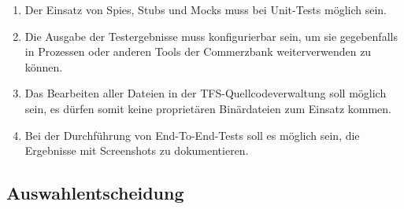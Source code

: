 \begin{enumerate}
	\item Der Einsatz von Spies, Stubs und Mocks muss bei Unit-Tests möglich sein.
	\item Die Ausgabe der Testergebnisse muss konfigurierbar sein, um sie gegebenfalls in Prozessen oder anderen Tools der Commerzbank weiterverwenden zu können.
	\item Das Bearbeiten aller Dateien in der TFS-Quellcodeverwaltung soll möglich sein, es dürfen somit keine proprietären Binärdateien zum Einsatz kommen.
	\item Bei der Durchführung von End-To-End-Tests soll es möglich sein, die Ergebnisse mit Screenshots zu dokumentieren.
\end{enumerate}




\subsection{Auswahlentscheidung}